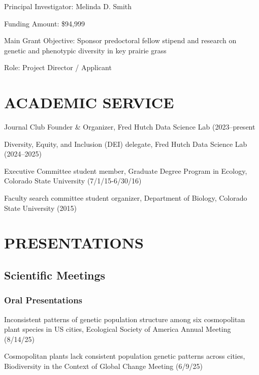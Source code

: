 \documentclass{cv}
\begin{document}
Principal Investigator: Melinda D. Smith

Funding Amount: \$94,999

Main Grant Objective: Sponsor predoctoral fellow stipend and research on genetic and phenotypic diversity in key prairie grass

Role: Project Director / Applicant


\section*{ACADEMIC SERVICE}

Journal Club Founder \& Organizer, Fred Hutch Data Science Lab (2023--present

Diversity, Equity, and Inclusion (DEI) delegate, Fred Hutch Data Science Lab (2024--2025)

Executive Committee student member, Graduate Degree Program in Ecology, Colorado State University (7/1/15-6/30/16)

Faculty search committee student organizer, Department of Biology, Colorado State University (2015)


\section*{PRESENTATIONS}

\subsection*{Scientific Meetings}

\subsubsection*{Oral Presentations}

Inconsistent patterns of genetic population structure among six cosmopolitan plant species in US cities, Ecological Society of America Annual Meeting (8/14/25)

Cosmopolitan plants lack consistent population genetic patterns across cities, Biodiversity in the Context of Global Change Meeting (6/9/25)
\end{document}
